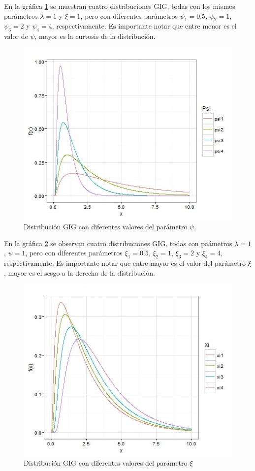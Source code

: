 En la gráfica \ref{fig:gigdiferentesvaloresdepsi} se muestran cuatro distribuciones GIG, todas con los mismos parámetros $\lambda=1$ y $\xi=1$, pero con diferentes parámetros $\psi_{1}=0.5$, $\psi_{2}=1$, $\psi_{3}=2$ y $\psi_{4}=4$, respectivamente. Es importante notar que entre menor es el valor de $\psi$, mayor es la curtosis de la distribución. \\


\begin{figure}[ht]
	\centering
	\includegraphics[width=0.8\linewidth]{Figuras/gigdiferentesvaloresdepsi}
	\caption{Distribución GIG con diferentes valores del parámetro $\psi$.}
	\label{fig:gigdiferentesvaloresdepsi}
\end{figure}

En la gráfica \ref{fig:gigcondiferentesvaloresdexi} se observan cuatro distribuciones GIG, todas con paámetros $\lambda=1$ , $\psi=1$, pero con diferentes parámetros $\xi_{1}=0.5$, $\xi_{2}=1$, $\xi_{3}=2$ y $\xi_{4}=4$, respectivamente. Es importante notar que entre mayor es el valor del parámetro $\xi$, mayor es el sesgo a la derecha de la distribución.

\newpage
\begin{figure}[ht]
	\centering
	\includegraphics[width=0.8\linewidth]{Figuras/gigcondiferentesvaloresdexi}
	\caption{Distribución GIG con diferentes valores del parámetro $\xi$}
	\label{fig:gigcondiferentesvaloresdexi}
\end{figure}

